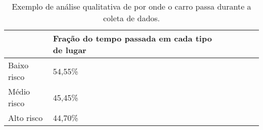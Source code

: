\begin{table}[]

    \caption{Exemplo de análise qualitativa de por onde o carro passa durante a coleta de dados.}
    \label{Tb:tab_fracao_perigo}
    \centering

    \begin{center}
        \begin{tabular}{ccc p{6cm} ccc}
            
            \multicolumn{1}{l}{}  & \multicolumn{1}{|l}{
                \textbf{Fração do tempo passada em cada tipo de lugar}
            }  \\
            

            \hline
            
            \multicolumn{1}{l|}{Baixo risco}  & \multicolumn{1}{|l}{54,55\%}    \\

            \hline
            
            \multicolumn{1}{l|}{Médio risco}  & \multicolumn{1}{|l}{45,45\%}    \\

            \hline
            
            \multicolumn{1}{l|}{Alto risco}  & \multicolumn{1}{|l}{44,70\%}    \\
        \end{tabular}
    \end{center}
\end{table}
